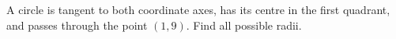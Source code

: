 A circle is tangent to both coordinate axes, has its centre in the first quadrant, and passes through the point $(1,9)$. Find all possible radii.
